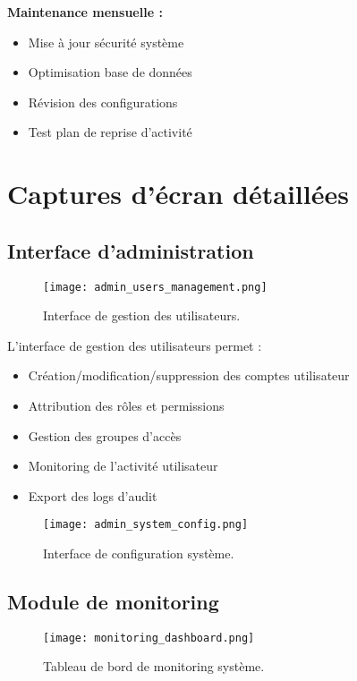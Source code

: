 \textbf{Maintenance mensuelle :}
\begin{itemize}
    \item Mise à jour sécurité système
    \item Optimisation base de données
    \item Révision des configurations
    \item Test plan de reprise d'activité
\end{itemize}

\chapter{Captures d'écran détaillées}
\label{app:captures}

\section{Interface d'administration}

\begin{figure}[hbt!]
    \centering
    \texttt{[image: admin\_users\_management.png]}
    \caption{Interface de gestion des utilisateurs.}
    \label{fig:admin-users}
\end{figure}

L'interface de gestion des utilisateurs permet :
\begin{itemize}
    \item Création/modification/suppression des comptes utilisateur
    \item Attribution des rôles et permissions
    \item Gestion des groupes d'accès
    \item Monitoring de l'activité utilisateur
    \item Export des logs d'audit
\end{itemize}

\begin{figure}[hbt!]
    \centering
    \texttt{[image: admin\_system\_config.png]}
    \caption{Interface de configuration système.}
    \label{fig:admin-config}
\end{figure}

\section{Module de monitoring}

\begin{figure}[hbt!]
    \centering
    \texttt{[image: monitoring\_dashboard.png]}
    \caption{Tableau de bord de monitoring système.}
    \label{fig:monitoring}
\end{figure}

